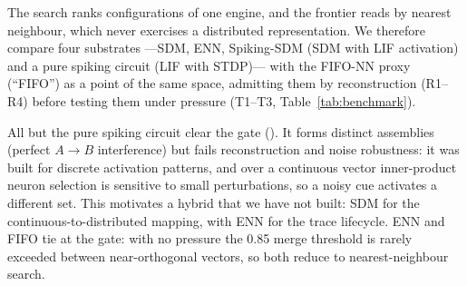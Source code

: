 \documentclass[conference]{IEEEtran}
\begin{document}
The search ranks configurations of one engine, and the frontier reads by
nearest neighbour, which never exercises a distributed representation. We
therefore compare four substrates ---SDM, ENN, Spiking-SDM (SDM with LIF
activation) and a pure spiking circuit (LIF with STDP)--- with the FIFO-NN
proxy (``FIFO'') as a point of the same space, admitting them by
reconstruction (R1--R4) before testing them under pressure (T1--T3,
Table~\ref{tab:benchmark}).



All but the pure spiking circuit clear the gate
(). It
forms distinct assemblies (perfect $A\to B$ interference) but fails
reconstruction and noise robustness: it was built for discrete activation
patterns, and over a continuous vector inner-product neuron selection is
sensitive to small perturbations, so a noisy cue activates a different set.
This motivates a hybrid that we have not built: SDM for the
continuous-to-distributed mapping, with ENN for the trace lifecycle. ENN and FIFO tie at the gate: with no
pressure the 0.85 merge threshold is rarely exceeded between near-orthogonal
vectors, so both reduce to nearest-neighbour search.
\end{document}
